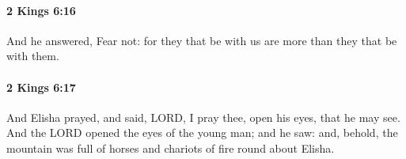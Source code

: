 		\paragraph{2 Kings 6:16} %
			\label{2KINGS-6-16}

			And he answered, Fear not: for they that be with us are more than they that be with them.


		\paragraph{2 Kings 6:17} %
			\label{2KINGS-6-17}

			And Elisha prayed, and said, LORD, I pray thee, open his eyes, that he may see. And the LORD opened the eyes of the young man; and he saw: and, behold, the mountain was full of horses and chariots of fire round about Elisha.



